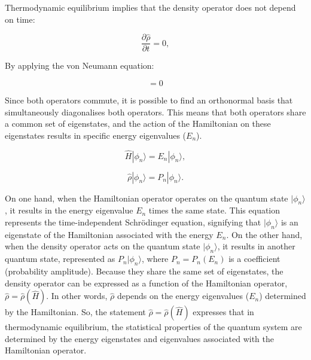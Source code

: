\documentclass[12pt,a4paper]{report}
\newcommand{\esp}{\vspace{0.5cm}}
\begin{document}
	\esp
	
	Thermodynamic equilibrium implies that the density operator does not depend on time:
	
	\esp
	
	\begin{equation}
		\frac{\partial \hat{\rho}}{\partial t} = 0,
	\end{equation}
	
	\esp
	
	\noindent By applying the von Neumann equation:
	
	\esp
	
	\begin{equation}
		[\hat{H}, \hat{\rho}(t)] = 0
	\end{equation}
	
	\esp
	
	Since both operators commute, it is possible to find an orthonormal basis that simultaneously diagonalises both operators. This means that both operators share a common set of eigenstates, and the action of the Hamiltonian on these eigenstates results in specific energy eigenvalues ($E_n$).
	
	\esp
	
	\begin{equation}
		\hat{H}|\phi_n\rangle = E_n|\phi_n\rangle,
	\end{equation}
	
	\esp
	
	\begin{equation}
		\hat{\rho}|\phi_n\rangle = P_n|\phi_n\rangle.
	\end{equation}
	
	\esp
	
	On one hand, when the Hamiltonian operator operates on the quantum state $|\phi_n\rangle$, it results in the energy eigenvalue $E_n$ times the same state. This equation represents the time-independent Schrödinger equation, signifying that $|\phi_n\rangle$ is an eigenstate of the Hamiltonian associated with the energy $E_n$. On the other hand, when the density operator acts on the quantum state $|\phi_n\rangle$, it results in another quantum state, represented as $P_n|\phi_n\rangle$, where $P_n = P_n(E_n)$ is a coefficient (probability amplitude). Because they share the same set of eigenstates, the density operator can be expressed as a function of the Hamiltonian operator, $\hat{\rho} = \hat{\rho}(\hat{H})$. In other words, $\hat{\rho}$ depends on the energy eigenvalues ($E_n$) determined by the Hamiltonian. So, the statement $\hat{\rho} = \hat{\rho}(\hat{H})$ expresses that in thermodynamic equilibrium, the statistical properties of the quantum system are determined by the energy eigenstates and eigenvalues associated with the Hamiltonian operator.
	
\end{document}
